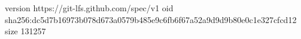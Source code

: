 version https://git-lfs.github.com/spec/v1
oid sha256:dc5d7b16973b078d673a0579b485e9c6fb6f67a52a9d9d9b80e0c1e327cfcd12
size 131257

